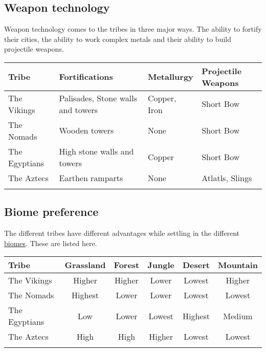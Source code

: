 \begin{landscape}
	\newpage

	\subsection{Weapon technology}
	Weapon technology comes to the tribes in three major ways. The ability to
	fortify their cities, the ability to work complex metals and their ability to
	build projectile weapons.

	\begin{longtable}{p{5cm}p{5cm}p{4cm}p{6cm}}
		\toprule{}
		Tribe
		 & Fortifications
		 & Metallurgy
		 & Projectile Weapons                \\
		\midrule{}
		The \gls{Vikings}
		 & Palisades, Stone walls and towers
		 & Copper, Iron
		 & Short Bow                         \\
		The \gls{Nomads}
		 & Wooden towers
		 & None
		 & Short Bow                         \\
		The \gls{Egyptians}
		 & High stone walls and towers
		 & Copper
		 & Short Bow                         \\
		The \gls{Aztecs}
		 & Earthen ramparts
		 & None
		 & Atlatls, Slings                   \\
		\bottomrule{}
	\end{longtable}

	\subsection{Biome preference}
	The different tribes have different advantages while settling in the different
	\hyperref[ch:World:Biomes]{biomes}. These are listed here.

	\begin{longtable}{p{5cm}ccccc}
		\toprule{}
		Tribe
		 & Grassland
		 & Forest
		 & Jungle
		 & Desert
		 & Mountain  \\
		\midrule{}
		The \gls{Vikings}
		 & Higher
		 & Higher
		 & Lower
		 & Lowest
		 & Higher    \\
		The \gls{Nomads}
		 & Highest
		 & Lower
		 & Lower
		 & Lowest
		 & Lowest    \\
		The \gls{Egyptians}
		 & Low
		 & Lower
		 & Lowest
		 & Highest
		 & Medium    \\
		The \gls{Aztecs}
		 & High
		 & High
		 & Higher
		 & Lowest
		 & Lowest    \\
		\bottomrule{}
	\end{longtable}

\end{landscape}
